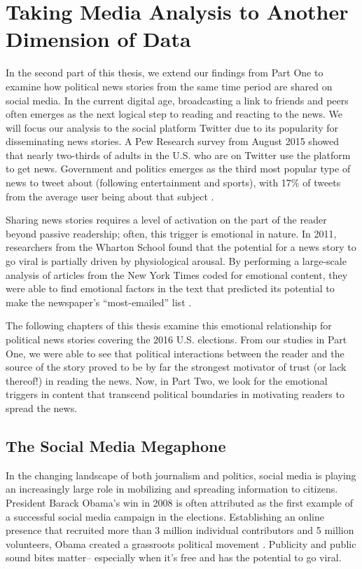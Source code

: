 \chapter{Taking Media Analysis to Another Dimension of Data}
In the second part of this thesis, we extend our findings from Part One to examine how political news stories from the same time period are shared on social media. In the current digital age, broadcasting a link to friends and peers often emerges as the next logical step to reading and reacting to the news. We will focus our analysis to the social platform Twitter due to its popularity for disseminating news stories. A Pew Research survey from August 2015 showed that nearly two-thirds of adults in the U.S. who are on Twitter use the platform to get news.  Government and politics emerges as the third most popular type of news to tweet about (following entertainment and sports), with 17\% of tweets from the average user being about that subject \cite{pew-twitter-news}.

Sharing news stories requires a level of activation on the part of the reader beyond passive readership; often, this trigger is emotional in nature. In 2011, researchers from the Wharton School found that the potential for a news story to go viral is partially driven by physiological arousal. By performing a large-scale analysis of articles from the New York Times coded for emotional content, they were able to find emotional factors in the text that predicted its potential to make the newspaper’s “most-emailed” list \cite{berger2012makes}.

The following chapters of this thesis examine this emotional relationship for political news stories covering the 2016 U.S. elections. From our studies in Part One, we were able to see that political interactions between the reader and the source of the story proved to be by far the strongest motivator of trust (or lack thereof!) in reading the news. Now, in Part Two, we look for the emotional triggers in content that transcend political boundaries in motivating readers to spread the news.


\section{The Social Media Megaphone}
In the changing landscape of both journalism and politics, social media is playing an increasingly large role in mobilizing and spreading information to citizens. President Barack Obama’s win in 2008 is often attributed as the first example of a successful social media campaign in the elections. Establishing an online presence that recruited more than 3 million individual contributors and 5 million volunteers, Obama created a grassroots political movement \cite{cogburn2011networked}. Publicity and public sound bites matter-- especially when it’s free and has the potential to go viral.

